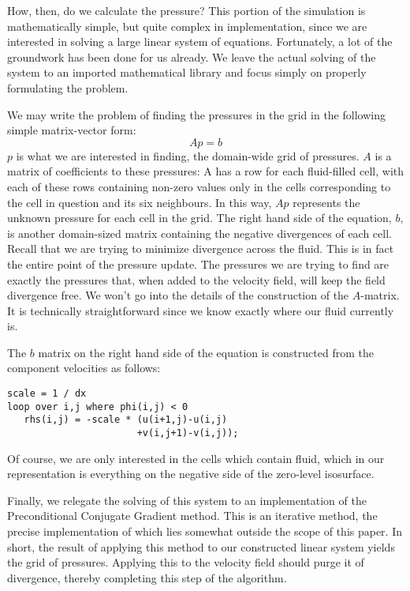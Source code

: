 How, then, do we calculate the pressure? This portion of the
simulation is mathematically simple, but quite complex in
implementation, since we are interested in solving a large linear
system of equations.  Fortunately, a lot of the groundwork has been
done for us already. We leave the actual solving of the system to an
imported mathematical library and focus simply on properly formulating
the problem.

We may write the problem of finding the pressures in the grid in the
following simple matrix-vector form:
\begin{equation}
Ap = b
\end{equation}
$p$ is what we are interested in finding, the domain-wide grid of
pressures. $A$ is a matrix of coefficients to these pressures: A has a
row for each fluid-filled cell, with each of these rows containing
non-zero values only in the cells corresponding to the cell in
question and its six neighbours. In this way, $Ap$ represents the
unknown pressure for each cell in the grid. The right hand side of the
equation, $b$, is another domain-sized matrix containing the negative
divergences of each cell. Recall that we are trying to minimize
divergence across the fluid. This is in fact the entire point of the
pressure update. The pressures we are trying to find are exactly the
pressures that, when added to the velocity field, will keep the field
divergence free.  We won't go into the details of the construction of
the $A$-matrix. It is technically straightforward since we know
exactly where our fluid currently is.

The $b$ matrix on the right hand side of the equation is constructed
from the component velocities as follows:
\begin{lstlisting}
scale = 1 / dx
loop over i,j where phi(i,j) < 0
   rhs(i,j) = -scale * (u(i+1,j)-u(i,j)
                       +v(i,j+1)-v(i,j));
\end{lstlisting}
Of course, we are only interested in the cells which contain fluid,
which in our representation is everything on the negative side of the
zero-level isosurface.

Finally, we relegate the solving of this system to an implementation
of the Preconditional Conjugate Gradient method. This is an iterative
method, the precise implementation of which lies somewhat outside the
scope of this paper. In short, the result of applying this method to
our constructed linear system yields the grid of pressures. Applying
this to the velocity field should purge it of divergence, thereby
completing this step of the algorithm.

